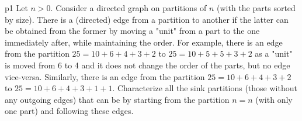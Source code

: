 \documentclass[a4paper, 11pt]{article}
\newcounter{problem}
\begin{document}
\begin{problem}{%
	}{p1%
}
Let $n>0$. Consider a directed graph on partitions of $n$ (with the parts sorted by size). There is a (directed) edge from a partition to another if the latter can be obtained from the former by moving a "unit" from a part to the one immediately after, while maintaining the order. For example, there is an edge from the partition $25=10+6+4+3+2$ to $25=10+5+5+3+2$ as a "unit" is moved from 6 to 4 and it does not change the order of the parts, but no edge vice-versa. Similarly, there is an edge from the partition $25=10+6+4+3+2$ to $25=10+6+4+3+1+1$. Characterize all the sink partitions (those without any outgoing edges) that can be by starting from the partition $n=n$ (with only one part) and following these edges.
\end{problem}
\end{document}

